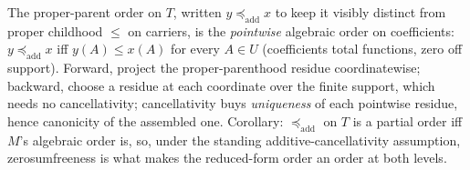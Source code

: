 \begin{lemma}\label{lem:pointwise}
The proper-parent order on $T$, written $y \preceq_{\mathrm{add}} x$ to keep it visibly distinct from proper childhood $\le$ on carriers, is the \emph{pointwise} algebraic order on coefficients: $y \preceq_{\mathrm{add}} x$ iff $y(A) \leq x(A)$ for every $A \in U$ (coefficients total functions, zero off support). Forward, project the proper-parenthood residue coordinatewise; backward, choose a residue at each coordinate over the finite support, which needs no cancellativity; cancellativity buys \emph{uniqueness} of each pointwise residue, hence canonicity of the assembled one. Corollary: $\preceq_{\mathrm{add}}$ on $T$ is a partial order iff $M$'s algebraic order is, so, under the standing additive-cancellativity assumption, zerosumfreeness is what makes the reduced-form order an order at both levels.

\end{lemma}
